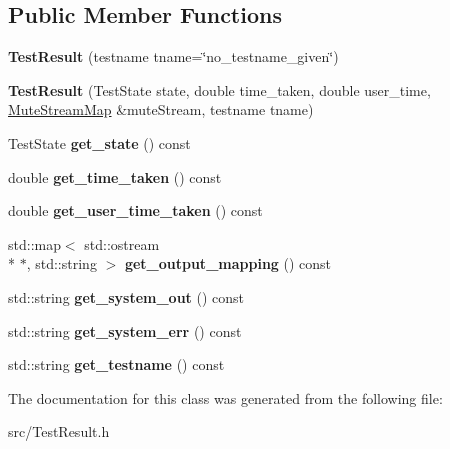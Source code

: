 \subsection*{Public Member Functions}
\begin{DoxyCompactItemize}
\item 
\hypertarget{class_l_test_source_1_1_test_result_a9401206755e0fc46d55574cfe1c15655}{{\bfseries Test\-Result} (testname tname=\char`\"{}no\-\_\-testname\-\_\-given\char`\"{})}\label{class_l_test_source_1_1_test_result_a9401206755e0fc46d55574cfe1c15655}

\item 
\hypertarget{class_l_test_source_1_1_test_result_aca536a16a167b88f7efbd1398913bbc3}{{\bfseries Test\-Result} (Test\-State state, double time\-\_\-taken, double user\-\_\-time, \hyperlink{class_l_test_source_1_1_mute_stream_map}{Mute\-Stream\-Map} \&mute\-Stream, testname tname)}\label{class_l_test_source_1_1_test_result_aca536a16a167b88f7efbd1398913bbc3}

\item 
\hypertarget{class_l_test_source_1_1_test_result_ab1697806fc1e70b1ccbd05d52ab0ddcb}{Test\-State {\bfseries get\-\_\-state} () const }\label{class_l_test_source_1_1_test_result_ab1697806fc1e70b1ccbd05d52ab0ddcb}

\item 
\hypertarget{class_l_test_source_1_1_test_result_aa303fab825369875755407c76fa9c5e4}{double {\bfseries get\-\_\-time\-\_\-taken} () const }\label{class_l_test_source_1_1_test_result_aa303fab825369875755407c76fa9c5e4}

\item 
\hypertarget{class_l_test_source_1_1_test_result_a37cace5d35b174f9aa827694adf6458c}{double {\bfseries get\-\_\-user\-\_\-time\-\_\-taken} () const }\label{class_l_test_source_1_1_test_result_a37cace5d35b174f9aa827694adf6458c}

\item 
\hypertarget{class_l_test_source_1_1_test_result_a88df565269d55dfe103303dde76c01ca}{std\-::map$<$ std\-::ostream \\*
$\ast$, std\-::string $>$ {\bfseries get\-\_\-output\-\_\-mapping} () const }\label{class_l_test_source_1_1_test_result_a88df565269d55dfe103303dde76c01ca}

\item 
\hypertarget{class_l_test_source_1_1_test_result_ae82ef92a9a845f3db19d689fad07e006}{std\-::string {\bfseries get\-\_\-system\-\_\-out} () const }\label{class_l_test_source_1_1_test_result_ae82ef92a9a845f3db19d689fad07e006}

\item 
\hypertarget{class_l_test_source_1_1_test_result_a5f7e5237c246e67f1feee5dc728319e0}{std\-::string {\bfseries get\-\_\-system\-\_\-err} () const }\label{class_l_test_source_1_1_test_result_a5f7e5237c246e67f1feee5dc728319e0}

\item 
\hypertarget{class_l_test_source_1_1_test_result_acb39d9796e1c169fc3cb16f8c513ebb4}{std\-::string {\bfseries get\-\_\-testname} () const }\label{class_l_test_source_1_1_test_result_acb39d9796e1c169fc3cb16f8c513ebb4}

\end{DoxyCompactItemize}


The documentation for this class was generated from the following file\-:\begin{DoxyCompactItemize}
\item 
src/Test\-Result.\-h\end{DoxyCompactItemize}
